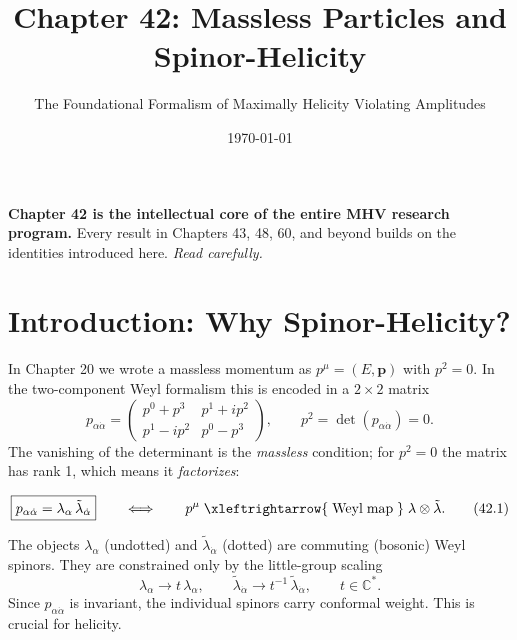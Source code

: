 \documentclass[12pt]{article}
\begin{document}
\title{Chapter 42: Massless Particles and Spinor-Helicity}
\subtitle{\large The Foundational Formalism of Maximally Helicity Violating Amplitudes}
\date{\today}
\maketitle

\begin{mdframed}[backgroundcolor=blue!5]
\textbf{Chapter 42 is the intellectual core of the entire MHV research program.}
Every result in Chapters 43, 48, 60, and beyond builds on the identities
introduced here. \emph{Read carefully.}
\end{mdframed}

\tableofcontents
\newpage

\section{Introduction: Why Spinor-Helicity?}

In Chapter 20 we wrote a massless momentum as $p^\mu=(E,\mathbf{p})$ with
$p^2=0$.  In the two-component Weyl formalism this is encoded in a
$2\times2$ matrix
\begin{equation}
p_{\alpha\dot\alpha}
= \begin{pmatrix} p^0+p^3 & p^1+ip^2 \\ p^1-ip^2 & p^0-p^3 \end{pmatrix},
\qquad p^2 = \det(p_{\alpha\dot\alpha}) = 0 .
\end{equation}
The vanishing of the determinant is the \emph{massless} condition; for $p^2=0$
the matrix has rank 1, which means it \emph{factorizes}:

\begin{mdframed}[backgroundcolor=green!5]
\begin{equation}
\boxed{p_{\alpha\dot\alpha}
= \lambda_\alpha\,\tilde\lambda_{\dot\alpha}}
\qquad\Longleftrightarrow\qquad
p^\mu \;\xleftrightarrow{\;\mathrm{Weyl\;map}\;}\;
\lambda\otimes\tilde\lambda .
\tag{42.1}
\end{equation}
\end{mdframed}

The objects $\lambda_\alpha$ (undotted) and $\tilde\lambda_{\dot\alpha}$
(dotted) are commuting (bosonic) Weyl spinors.  They are constrained only by the
little-group scaling
\begin{equation}
\lambda_\alpha\to t\,\lambda_\alpha,\qquad
\tilde\lambda_{\dot\alpha}\to t^{-1}\,\tilde\lambda_{\dot\alpha},
\qquad t\in\mathbb{C}^* .
\tag{42.2}
\end{equation}
Since $p_{\alpha\dot\alpha}$ is invariant, the individual spinors carry
conformal weight.  This is crucial for helicity.
\end{document}
